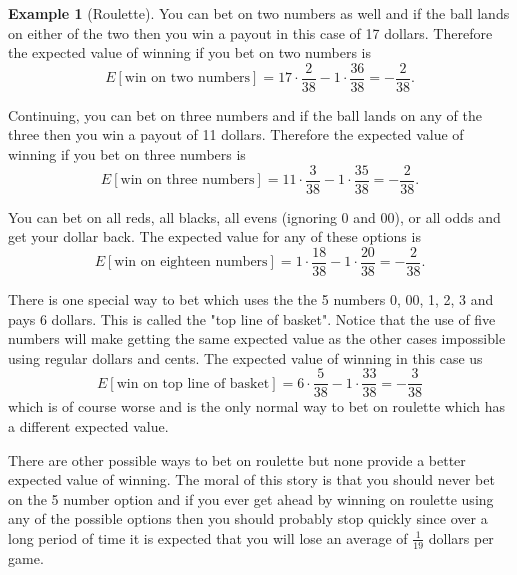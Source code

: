 \documentclass[10pt,]{book}
\theoremstyle{plain}
\theoremstyle{definition}
\theoremstyle{definition}
\newtheorem{example}[theorem]{Example}
\theoremstyle{definition}
\numberwithin{equation}{section}
\begin{document}
\begin{example}[Roulette]
You can bet on two numbers as well and if the ball lands on either of the two then you win a payout in this case of 17 dollars.  Therefore the expected value of winning if you bet on two numbers is
\begin{equation*}E[\text{win on two numbers}] = 17 \cdot \frac{2}{38} - 1 \cdot \frac{36}{38} = - \frac{2}{38}.\end{equation*}
%
\par

Continuing, you can bet on three numbers and if the ball lands on any of the three then you win a payout of 11 dollars.  Therefore the expected value of winning if you bet on three numbers is
\begin{equation*}E[\text{win on three numbers}] = 11 \cdot \frac{3}{38} - 1 \cdot \frac{35}{38} = - \frac{2}{38}.\end{equation*}
%
\par

You can bet on all reds, all blacks, all evens (ignoring 0 and 00), or all odds and get your dollar back. The expected value for any of these options is
\begin{equation*}E[\text{win on eighteen numbers}] = 1 \cdot \frac{18}{38} - 1 \cdot \frac{20}{38} = - \frac{2}{38}.\end{equation*}
%
\par
There is one special way to bet which uses the the 5 numbers {0, 00, 1, 2, 3} and pays 6 dollars. This is called the "top line of basket".  Notice that the use of five numbers will make getting the same expected value as the other cases impossible using regular dollars and cents. The expected value of winning in this case us
\begin{equation*}E[\text{win on top line of basket}] = 6 \cdot \frac{5}{38} - 1 \cdot \frac{33}{38} = - \frac{3}{38}\end{equation*}
which is of course worse and is the only normal way to bet on roulette which has a different expected value. 
%
\par

There are other possible ways to bet on roulette but none provide a better expected value of winning.  The moral of this story is that you should never bet on the 5 number option and if you ever get ahead by winning on roulette using any of the possible options then you should probably stop quickly since over a long period of time it is expected that you will lose an average of \(\frac{1}{19}\) dollars per game.
%
\end{example}
\end{document}
